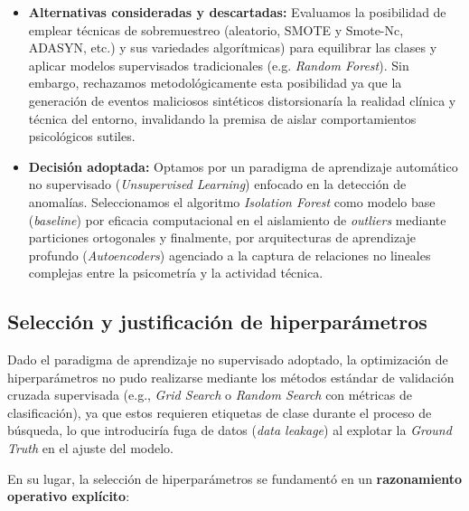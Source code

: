 \documentclass[IB]{TFUOC}%
\begin{document}
\begin{itemize}
    \item \textbf{Alternativas consideradas y descartadas:}
    Evaluamos la posibilidad de emplear técnicas de sobremuestreo (aleatorio, SMOTE y Smote-Nc, ADASYN, etc.) y sus variedades algorítmicas) para equilibrar las clases y aplicar modelos supervisados tradicionales (e.g. \textit{Random Forest}). Sin embargo, rechazamos metodológicamente esta posibilidad ya que la generación de eventos maliciosos sintéticos distorsionaría la realidad clínica y técnica del entorno, invalidando la premisa de aislar comportamientos psicológicos sutiles.
    \item \textbf{Decisión adoptada:}
    Optamos por un paradigma de aprendizaje automático no supervisado (\textit{Unsupervised Learning}) enfocado en la detección de anomalías. Seleccionamos el algoritmo \textit{Isolation Forest} como modelo base (\textit{baseline}) por eficacia computacional en el aislamiento de \textit{outliers} mediante particiones ortogonales y finalmente, por arquitecturas de aprendizaje profundo (\textit{Autoencoders}) agenciado a la captura de relaciones no lineales complejas entre la psicometría y la actividad técnica.    
\end{itemize}

\subsection{Selección y justificación de hiperparámetros}

Dado el paradigma de aprendizaje no supervisado adoptado, la optimización de hiperparámetros no pudo realizarse mediante los métodos estándar de validación cruzada supervisada (e.g., \textit{Grid Search} o \textit{Random Search} con métricas de clasificación), ya que estos requieren etiquetas de clase durante el proceso de búsqueda, lo que introduciría fuga de datos (\textit{data leakage}) al explotar la \textit{Ground Truth} en el ajuste del modelo.

\medskip
\noindent En su lugar, la selección de hiperparámetros se fundamentó en un \textbf{razonamiento operativo explícito}:
\end{document}
